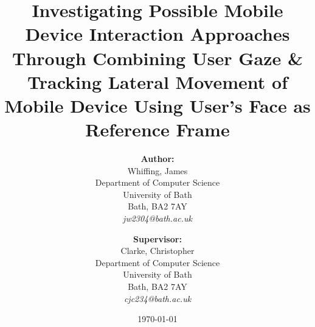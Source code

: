 
\thispagestyle{empty} %

\title{Investigating Possible Mobile Device Interaction Approaches Through Combining User Gaze \& Tracking Lateral Movement of Mobile Device Using User's Face as Reference Frame}

\renewcommand\maketitlehookb{\centering \Large CM50175 - Project Proposal}
\date{\today}
\author{
    \textbf{Author:}\\
    Whiffing, James\\
    Department of Computer Science\\
    University of Bath\\
    Bath, BA2 7AY \\
    \textit{jw2304@bath.ac.uk} \\
    \and
    \textbf{Supervisor:}\\
    Clarke, Christopher\\
    Department of Computer Science\\
    University of Bath\\
    Bath, BA2 7AY \\
    \textit{cjc234@bath.ac.uk} \\
}

\maketitle

\clearpage
\restoregeometry
\newpage

\setcounter{page}{0}
\pagestyle{fancy}


\tableofcontents
\clearpage
\newpage
{}
\listoffigures
\clearpage
\newpage
{}
\listoftables
\clearpage
\newpage


\setcounter{page}{1}
